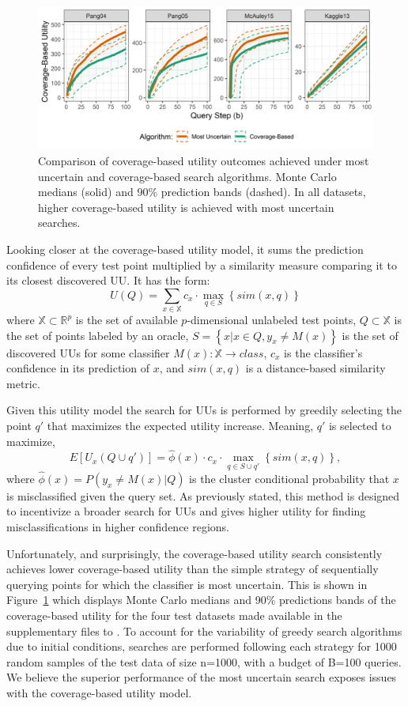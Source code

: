 \documentclass[conference]{IEEEtran}
\begin{document}
\begin{figure}[h!]
  \centering
  \includegraphics[width=\textwidth]{CoverageVsMostUncertainNarrow.png}
  \caption{Comparison of coverage-based utility outcomes achieved under most uncertain and coverage-based search algorithms. Monte Carlo medians (solid) and 90\% prediction bands (dashed).  In all datasets, higher coverage-based utility is achieved with most uncertain searches.}
  \label{fig:coverutil}
\end{figure}

Looking closer at the coverage-based utility model, it sums the prediction confidence of every test point multiplied by a similarity measure comparing it to its closest discovered UU.  It has the form: $$U(Q) = \sum_{x \in \mathbb{X}} c_x \cdot \max_{q \in S} \left\{sim\left(x,q \right) \right\}$$ where $\mathbb{X} \subset \mathbb{R}^p$ is the set of available $p$-dimensional unlabeled test points, $Q \subset \mathbb{X}$ is the set of points labeled by an oracle, $S = \left\{x|x \in Q, y_x \neq M(x)\right\}$ is the set of discovered UUs for some classifier $M(x):\mathbb{X} \rightarrow class$, $c_x$ is the classifier's confidence in its prediction of $x$, and $sim(x,q)$ is a distance-based similarity metric. 

Given this utility model the search for UUs is performed by greedily selecting the point $q'$ that maximizes the expected utility increase.  Meaning, $q'$ is selected to maximize, $$E\left[U_x\left(Q \cup q'\right)\right] = \hat{\phi}(x) \cdot c_x \cdot \max_{q \in S \cup q'} \left\{sim\left(x,q \right) \right\},$$ where $\hat{\phi}(x) = P\left(y_x \neq M(x) |Q \right)$ is the cluster conditional probability that $x$ is misclassified given the query set.  As previously stated, this method is designed to incentivize a broader search for UUs and gives higher utility for finding misclassifications in higher confidence regions.  

Unfortunately, and surprisingly, the coverage-based utility search consistently achieves lower coverage-based utility than the simple strategy of sequentially querying points for which the classifier is most uncertain.  This is shown in Figure~\ref{fig:coverutil} which displays Monte Carlo medians and 90\% predictions bands of the coverage-based utility for the four test datasets made available in the supplementary files to \citet{Bansal2018}.  To account for the variability of greedy search algorithms due to initial conditions, searches are performed following each strategy for 1000 random samples of the test data of size n=1000, with a budget of B=100 queries.  We believe the superior performance of the most uncertain search exposes issues with the coverage-based utility model.  
\end{document}
